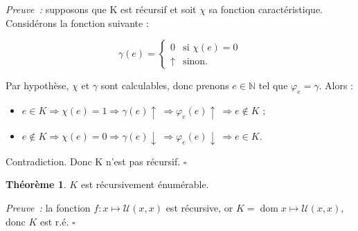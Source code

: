 \documentclass{book}
\theoremstyle{definition}
\newtheorem{theorem}{Théorème}
\numberwithin{lemma}{subsection}
\numberwithin{theorem}{subsection}
\numberwithin{definition}{subsection}
\numberwithin{proposition}{subsection}
\numberwithin{corollary}{subsection}
\numberwithin{property}{subsection}
\numberwithin{example}{subsection}
\numberwithin{heuristique}{subsection}
\numberwithin{scenario}{subsection}
\newenvironment{proofi} {\noindent\emph{Preuve~:}} {\hfill $\square$\vspace{0.2cm}}
\newcommand{\Universal}{\mathcal{U}}
\DeclareMathOperator{\dom}{dom}
\begin{document}

\begin{proofi}
supposons que K est récursif et soit $\chi$ sa fonction caractéristique. Considérons la fonction suivante :

\[
\gamma(e) = \begin{cases}
    0 & \text{si }\chi(e) = 0\\
    \uparrow & \text{sinon}.
\end{cases}
\]

Par hypothèse, $\chi$ et $\gamma$ sont calculables, donc prenons $e \in \mathbb{N}$ tel que $\varphi_e = \gamma$. Alors :

\begin{itemize}
    \item $e \in K \Rightarrow \chi(e) = 1 \Rightarrow \gamma(e)\uparrow\ \Rightarrow \varphi_e(e)\uparrow\ \Rightarrow e \notin K$ ;
    \item $e \notin K \Rightarrow \chi(e) = 0 \Rightarrow \gamma(e)\downarrow\ \Rightarrow \varphi_e(e)\downarrow\ \Rightarrow e \in K$.
\end{itemize}

Contradiction. Donc K n’est pas récursif.
\end{proofi}

\begin{theorem}
$K$ est récursivement énumérable.
\end{theorem}

\begin{proofi}
la fonction $f : x \mapsto \Universal(x, x)$ est récursive, or $K = \dom{x \mapsto \Universal(x, x)}$, donc $K$ est r.é.
\end{proofi}
\end{document}
